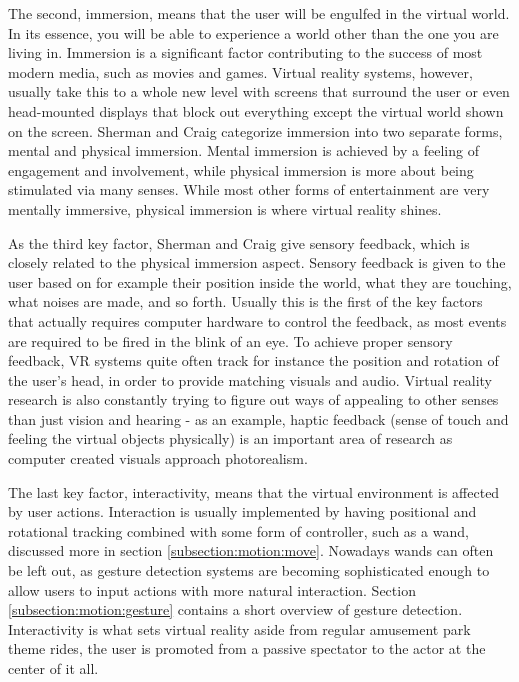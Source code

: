 \documentclass[12pt,a4paper,oneside,pdftex]{report}
\begin{document}
The second, immersion, means that the user will be engulfed in the virtual world. In its essence, you will be able to experience a world other than the one you are living in. Immersion is a significant factor contributing to the success of most modern media, such as movies and games. Virtual reality systems, however, usually take this to a whole new level with screens that surround the user or even head-mounted displays that block out everything except the virtual world shown on the screen. Sherman and Craig categorize immersion into two separate forms, mental and physical immersion. Mental immersion is achieved by a feeling of engagement and involvement, while physical immersion is more about being stimulated via many senses. While most other forms of entertainment are very mentally immersive, physical immersion is where virtual reality shines.

As the third key factor, Sherman and Craig give sensory feedback, which is closely related to the physical immersion aspect. Sensory feedback is given to the user based on for example their position inside the world, what they are touching, what noises are made, and so forth. Usually this is the first of the key factors that actually requires computer hardware to control the feedback, as most events are required to be fired in the blink of an eye. To achieve proper sensory feedback, VR systems quite often track for instance the position and rotation of the user's head, in order to provide matching visuals and audio. Virtual reality research is also constantly trying to figure out ways of appealing to other senses than just vision and hearing - as an example, haptic feedback (sense of touch and feeling the virtual objects physically) is an important area of research as computer created visuals approach photorealism.

The last key factor, interactivity, means that the virtual environment is affected by user actions. Interaction is usually implemented by having positional and rotational tracking combined with some form of controller, such as a wand, discussed more in section \ref{subsection:motion:move}. Nowadays wands can often be left out, as gesture detection systems are becoming sophisticated enough to allow users to input actions with more natural interaction. Section \ref{subsection:motion:gesture} contains a short overview of gesture detection. Interactivity is what sets virtual reality aside from regular amusement park theme rides, the user is promoted from a passive spectator to the actor at the center of it all.
\end{document}
